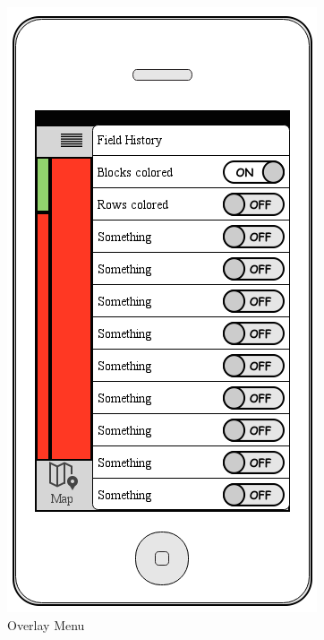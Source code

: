 \documentclass[12pt]{article}
\begin{document}
\begin{figure}[ht]
	\includegraphics[width=\linewidth, height=0.4\textheight, keepaspectratio=true]{mockups/OverlayMenu.png}
	\caption{Overlay Menu}
	\endminipage\hfill
	\centering

\end{figure}
\end{document}
